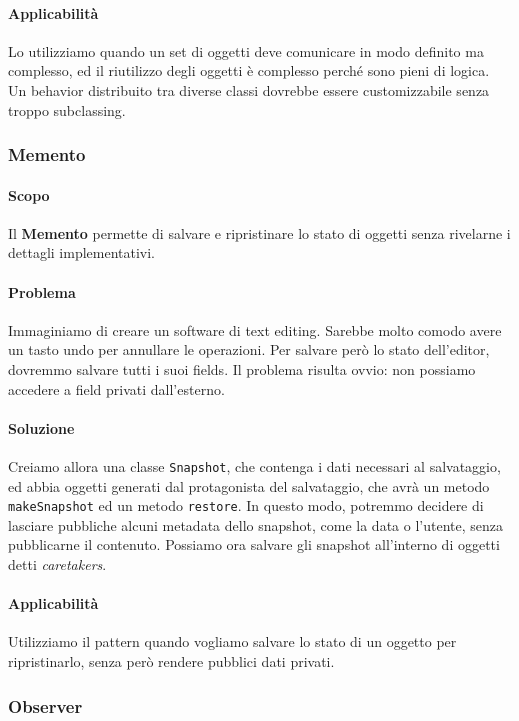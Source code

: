 \documentclass[11pt]{article}
\newcommand{\code}[1]{\texttt{#1}}
\begin{document}
\paragraph{Applicabilità}
Lo utilizziamo quando un set di oggetti deve comunicare in modo definito ma complesso, ed il riutilizzo degli oggetti è complesso perché sono pieni di logica. Un behavior distribuito tra diverse classi dovrebbe essere customizzabile senza troppo subclassing. 

\subsubsection{Memento}
\paragraph{Scopo}
Il \textbf{Memento} permette di salvare e ripristinare lo stato di oggetti senza rivelarne i dettagli implementativi. 
\paragraph{Problema}
Immaginiamo di creare un software di text editing. Sarebbe molto comodo avere un tasto undo per annullare le operazioni. Per salvare però lo stato dell'editor, dovremmo salvare tutti i suoi fields. Il problema risulta ovvio: non possiamo accedere a field privati dall'esterno. 
\paragraph{Soluzione}
Creiamo allora una classe \code{Snapshot}, che contenga i dati necessari al salvataggio, ed abbia oggetti generati dal protagonista del salvataggio, che avrà un metodo \code{makeSnapshot} ed un metodo \code{restore}. In questo modo, potremmo decidere di lasciare pubbliche alcuni metadata dello snapshot, come la data o l'utente, senza pubblicarne il contenuto. Possiamo ora salvare gli snapshot all'interno di oggetti detti \textit{caretakers}. 
\paragraph{Applicabilità}
Utilizziamo il pattern quando vogliamo salvare lo stato di un oggetto per ripristinarlo, senza però rendere pubblici dati privati. 

\subsubsection{Observer}
\end{document}

